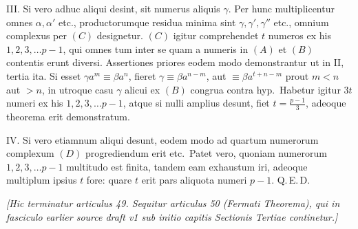 \documentclass[12pt,a4paper]{article}
\begin{document}
\medskip

\textsc{III.} Si vero adhuc aliqui desint, sit numerus aliquis $\gamma$. Per hunc
multiplicentur omnes $\alpha, \alpha'$ etc., productorumque residua minima sint
$\gamma, \gamma', \gamma''$ etc., omnium complexus per $(C)$ designetur. $(C)$ igitur
comprehendet $t$ numeros ex his $1, 2, 3, \ldots p - 1$, qui omnes tum inter se quam
a numeris in $(A)$ et $(B)$ contentis erunt diversi. Assertiones priores eodem modo
demonstrantur ut in \textsc{II}, tertia ita. Si esset $\gamma a^{m} \equiv \beta
a^{n}$, fieret $\gamma \equiv \beta a^{n-m}$, aut $\equiv \beta a^{t+n-m}$ prout
$m < n$ aut $> n$, in utroque casu $\gamma$ alicui ex $(B)$ congrua contra hyp.\
Habetur igitur $3t$ numeri ex his $1, 2, 3, \ldots p - 1$, atque si nulli amplius
desunt, fiet $t = \tfrac{p - 1}{3}$, adeoque theorema erit demonstratum.

\medskip

\textsc{IV.} Si vero etiamnum aliqui desunt, eodem modo ad quartum numerorum
complexum $(D)$ progrediendum erit etc.\ Patet vero, quoniam numerorum $1, 2, 3,
\ldots p - 1$ multitudo est finita, tandem eam exhaustum iri, adeoque multiplum
ipsius $t$ fore: quare $t$ erit pars aliquota numeri $p - 1$. Q.\,E.\,D.

\bigskip
\noindent\textit{[Hic terminatur articulus 49. Sequitur articulus 50 (Fermati Theorema),
qui in fasciculo earlier source draft v1 sub initio capitis Sectionis Tertiae continetur.]}
\end{document}
